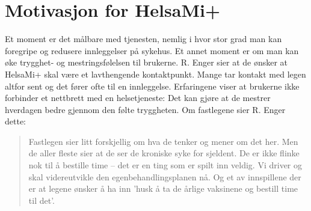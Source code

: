 \section{Motivasjon for HelsaMi+}
Et moment er det målbare med tjenesten, nemlig i hvor stor grad man kan foregripe og redusere innleggelser på sykehus. Et annet moment er om man kan
øke trygghet- og mestringsfølelsen til brukerne. R. Enger sier at de ønsker at HelsaMi+ skal være et lavthengende kontaktpunkt. Mange tar kontakt
med legen altfor sent og det fører ofte til en innleggelse. Erfaringene viser at brukerne ikke forbinder et nettbrett med en
helsetjeneste:  Det kan gjøre at de mestrer
hverdagen bedre gjennom den følte tryggheten. Om fastlegene sier R. Enger dette: \blockquote{Fastlegen sier litt forskjellig om hva de tenker og mener
om det her. Men de aller fleste sier at de ser de kroniske syke for sjeldent. De er ikke flinke nok til å bestille time -- det
er en ting som er spilt inn veldig. Vi driver og skal videreutvikle den
egenbehandlingsplanen nå. Og et av innspillene der er at legene ønsker å ha inn 'husk å ta de årlige vaksinene og bestill time til det'.}

